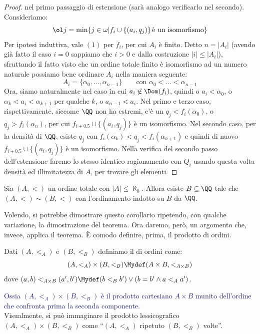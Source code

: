 \begin{proof}
	nel primo passaggio di estensione (sarà analogo verificarlo nel secondo). Consideriamo:
	\[ \ol j = \min\{j \in \omega | f_i \cup \{(a_i,q_j)\}\,\text{è un isomorfismo}\}
		\]
	Per ipotesi induttiva, vale $(1)$ per $f_i$, per cui $A_i$ è finito. Detto $n = |A_i|$ (avendo già fatto il caso $i = 0$ sappiamo che $i > 0$ e dalla costruzione $|i| \leq |A_i|$),
	sfruttando il fatto visto che un ordine totale finito è isomorfismo ad un numero naturale possiamo bene ordinare $A_i$ nella maniera seguente:
	\[ A_i = \{\alpha_0,\ldots,\alpha_{n-1}\} \qquad\text{con $\alpha_0<\ldots<\alpha_{n-1}$}
		\]
	Ora, siamo naturalmente nel caso in cui $a_i \not \in \Dom(f_i)$, quindi o $a_i <\alpha_0$, o $\alpha_k < a_i < \alpha_{k+1}$ per
	qualche $k$, o $a_{n-1}<a_i$. Nel primo e terzo caso, rispettivamente, siccome $\QQ$ non ha estremi, c'è un $q_j < f_i(\alpha_0)$, o $q_j > f_i(\alpha_n)$, per cui $f_{i + 0.5} \cup \{(a_i,q_j)\}$ è un isomorfismo.
	Nel secondo caso, per la densità di $\QQ$, esiste $q_j$ con $f_i(\alpha_k)<q_j<f_i(\alpha_{k+1})$ e quindi di nuovo $f_{i + 0.5}  \cup \{(a_i,q_j)\}$ è un isomorfismo. Nella verifica del secondo passo dell'estensione
	faremo lo stesso identico ragionamento con $Q_i$ usando questa volta densità ed illimitatezza di $A$, per trovare gli elementi.
\end{proof}

\begin{corollary}
	Sia $(A,<)$ un ordine totale con $|A| \leq \aleph_0$. Allora esiste $B \subseteq \QQ$ tale che $(A,<) \sim (B,<)$ con l'ordinamento indotto su $B$ da $\QQ$.
\end{corollary}

\begin{note}
	Volendo, si potrebbe dimostrare questo corollario ripetendo, con qualche variazione, la dimostrazione del teorema. Ora daremo, però,
	un argomento che, invece, applica il teorema. È comodo definire, prima, il prodotto di ordini.
\end{note}

\begin{definition}
	Dati $(A,<_A)$ e $(B,<_B)$ definiamo il  di ordini come:
	\[ (A,<_A) \times (B,<_B) \Mydef (A \times B, <_{A \times B})
 		\]
	dove $(a,b) <_{A \times B} (a',b') \Mydef (b <_B b') \lor (b = b' \land a <_A a')$.
\end{definition}

\textcolor{MidnightBlue}{Ossia $(A,<_A) \times (B,<_B)$ è il prodotto cartesiano $A \times B$ munito dell'ordine che confronta prima la seconda componente.}\\
Visualmente, si può immaginare il prodotto lessicografico $(A,<_A) \times (B,<_B)$ come ``$(A,<_A)$ ripetuto $(B,<_B)$ volte''.

